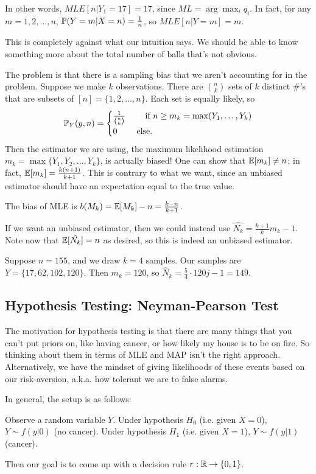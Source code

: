 \documentclass[11 pt]{scrartcl}
\begin{document}
In other words, $MLE[n | Y_1 = 17] = 17$, since $ML = \arg\max_{i} q_i$. In fact, for any $m = 1, 2, \dots, n$, $\mathbb P(Y = m | X = n) = \frac{1}{n}$, so $MLE[n | Y = m] = m$. 

This is completely against what our intuition says. We should be able to know something more about the total number of balls that's not obvious. 

The problem is that there is a sampling bias that we aren't accounting for in the problem. Suppose we make $k$ observations. There are $\binom{n}{k}$ sets of $k$ distinct $\#$'s that are subsets of $[n] = \{1, 2, \dots, n\}$. Each set is equally likely, so  
\[ \mathbb P_Y(y, n) = \begin{cases} 
\frac{1}{\binom{n}{k}} &\quad\text{ if } n \geq m_k = \max(Y_1, \dots, Y_k) \\         0 & \text{ else}. \end{cases} \] 
    Then the estimator we are using, the maximum likelihood estimation $m_k = \max\{Y_1, Y_2, \dots, Y_k\}$, is actually biased! One can show that $\mathbb E[m_k] \not = n$; in fact, $\mathbb E[m_k] = \frac{k(n+1)}{k+1}$. This is contrary to what we want, since an unbiased estimator should have an expectation equal to the true value. 

    The bias of MLE is $b(M_k) = \mathbb E[M_k] - n = \frac{k-n}{k+1}$. 

    If we want an unbiased estimator, then we could instead use $\hat{N_k} = \frac{k+1}{k} m_k - 1$. Note now that $\mathbb E[\hat{N_k}] = n$ as desired, so this is indeed an unbiased estimator. 

\begin{example}
    Suppose $n = 155$, and we draw $k = 4$ samples. Our samples are $Y = \{ 17, 62, 102, 120\}$. Then $m_k = 120$, so $\hat{N}_k = \frac{5}{4}\cdot 120j - 1 = 149$. 
\end{example}

\subsection{Hypothesis Testing: Neyman-Pearson Test}
The motivation for hypothesis testing is that there are many things that you can't put priors on, like having cancer, or how likely my house is to be on fire. So thinking about them in terms of MLE and MAP isn't the right approach. Alternatively, we have the mindset of giving likelihoods of these events based on our risk-aversion, a.k.a. how tolerant we are to false alarms. 

In general, the setup is as follows: 
\begin{itemize}
    \ii Observe a random variable $Y$. 
    \ii Under hypothesis $H_0$ (i.e. given $X=0$), $Y\sim f( y | 0)$ (no cancer). 
    \ii Under hypothesis $H_1$ (i.e. given $X=1$), $Y\sim f( y | 1)$ (cancer). 
\end{itemize}
Then our goal is to come up with a decision rule $r: \mathbb R\to \{0,1\}$. 
\end{document}
